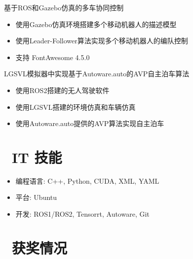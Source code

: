 \documentclass{resume}
\begin{document}
\begin{onehalfspacing}
基于ROS和Gazebo仿真的多车协同控制
\begin{itemize}
  \item 使用Gazebo仿真环境搭建多个移动机器人的描述模型
  \item 使用Leader-Follower算法实现多个移动机器人的编队控制
  \item 支持 FontAwesome 4.5.0
\end{itemize}
\end{onehalfspacing}

\begin{onehalfspacing}
LGSVL模拟器中实现基于Autoware.auto的AVP自主泊车算法
\begin{itemize}
  \item 使用ROS2搭建的无人驾驶软件
  \item 使用LGSVL搭建的环境仿真和车辆仿真
  \item 使用Autoware.auto提供的AVP算法实现自主泊车
\end{itemize}
\end{onehalfspacing}

\section{\faCogs\ IT 技能}
\begin{itemize}[parsep=0.5ex]
  \item 编程语言: C++, Python, CUDA, XML, YAML
  \item 平台: Ubuntu
  \item 开发: ROS1/ROS2, Tensorrt, Autoware, Git
\end{itemize}

\section{\faHeartO\ 获奖情况}
\end{document}
